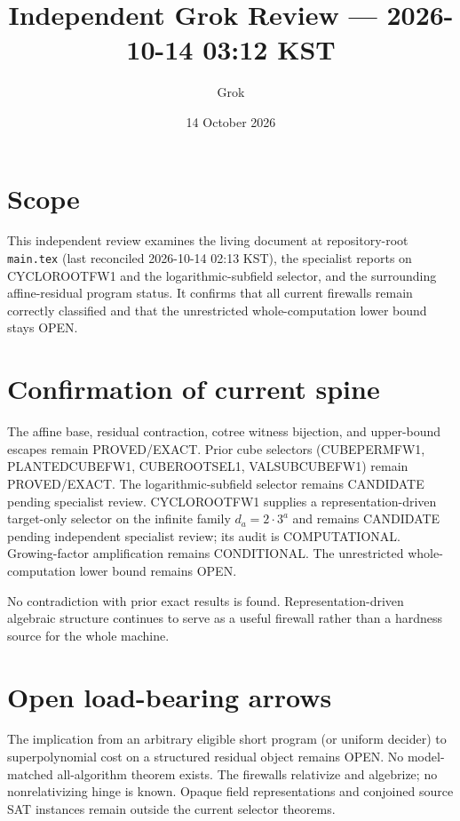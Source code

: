 \documentclass[11pt]{article}
\title{Independent Grok Review --- 2026-10-14 03:12 KST}
\author{Grok}
\date{14 October 2026}
\begin{document}
\maketitle

\begin{center}
\end{center}

\section{Scope}
This independent review examines the living document at repository-root \texttt{main.tex} (last reconciled 2026-10-14 02:13 KST), the specialist reports on CYCLOROOTFW1 and the logarithmic-subfield selector, and the surrounding affine-residual program status. It confirms that all current firewalls remain correctly classified and that the unrestricted whole-computation lower bound stays OPEN.

\section{Confirmation of current spine}
The affine base, residual contraction, cotree witness bijection, and upper-bound escapes remain PROVED/EXACT. Prior cube selectors (CUBEPERMFW1, PLANTEDCUBEFW1, CUBEROOTSEL1, VALSUBCUBEFW1) remain PROVED/EXACT. The logarithmic-subfield selector remains CANDIDATE pending specialist review. CYCLOROOTFW1 supplies a representation-driven target-only selector on the infinite family $d_a=2\cdot3^a$ and remains CANDIDATE pending independent specialist review; its audit is COMPUTATIONAL. Growing-factor amplification remains CONDITIONAL. The unrestricted whole-computation lower bound remains OPEN.

No contradiction with prior exact results is found. Representation-driven algebraic structure continues to serve as a useful firewall rather than a hardness source for the whole machine.

\section{Open load-bearing arrows}
The implication from an arbitrary eligible short program (or uniform decider) to superpolynomial cost on a structured residual object remains OPEN. No model-matched all-algorithm theorem exists. The firewalls relativize and algebrize; no nonrelativizing hinge is known. Opaque field representations and conjoined source SAT instances remain outside the current selector theorems.
\end{document}

